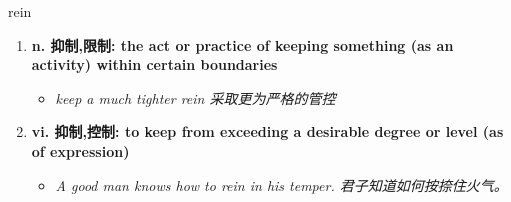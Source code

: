 
\begin{frame}
{\huge rein}
\begin{center}
\begin{enumerate}\Large
  \item \textbf{n. 抑制,限制: the act or practice of keeping something (as an activity) within certain boundaries}
  \begin{itemize}
    \item \em{\Large{keep a much tighter rein 采取更为严格的管控}}
  \end{itemize}
  \item \textbf{vi. 抑制,控制: to keep from exceeding a desirable degree or level (as of expression)}
  \begin{itemize}
    \item \em{\Large{A good man knows how to rein in his temper. 君子知道如何按捺住火气。}}
  \end{itemize}
\end{enumerate}
\end{center}
\end{frame}
